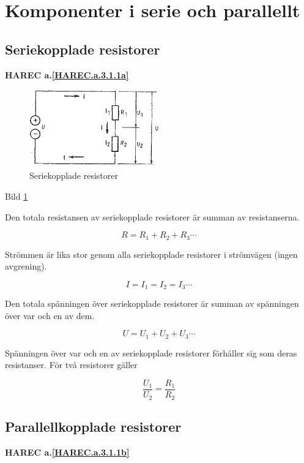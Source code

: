 \section{Komponenter i serie och parallellt}

\subsection{Seriekopplade resistorer}
\textbf{HAREC a.\ref{HAREC.a.3.1.1a}\label{myHAREC.a.3.1.1a}}

\begin{figure}
\includegraphics[width=0.5\textwidth]{images/bild_2_3-01.png}
\caption{Seriekopplade resistorer}
\label{fig:BildII3-01}
\end{figure}

Bild \ref{fig:BildII3-01}

Den totala resistansen av seriekopplade resistorer är summan av resistanserna.

\[R = R_1 + R_2 + R_3 \cdots \]

Strömmen är lika stor genom alla seriekopplade resistorer i strömvägen (ingen
avgrening).

\[I = I_1 = I_2 = I_3 \cdots \]

Den totala spänningen över seriekopplade resistorer är summan av spänningen över
var och en av dem.

\[U = U_1 + U_2 + U_3 \cdots \]

Spänningen över var och en av seriekopplade resistorer förhåller sig som deras
resistanser. För två resistorer gäller

\[\frac{U_1}{U_2} = \frac{R_1}{R_2}\]


\subsection{Parallellkopplade resistorer}
\textbf{HAREC a.\ref{HAREC.a.3.1.1b}\label{myHAREC.a.3.1.1b}}

